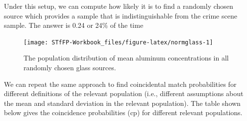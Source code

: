 \documentclass[]{book}
\theoremstyle{definition}
\theoremstyle{definition}
\theoremstyle{remark}
\begin{document}
Under this setup, we can compute how likely it is to find a randomly
chosen source which provides a sample that is indistinguishable from the
crime scene sample. The answer is 0.24 or 24\% of the time

\begin{figure}[h]

{\centering \texttt{[image: STfFP-Workbook\_files/figure-latex/normglass-1]} 

}

\caption{The population distribution of mean aluminum concentrations in all randomly chosen glass sources.}\label{fig:normglass}
\end{figure}

We can repeat the same approach to find coincidental match probabilities
for different definitions of the relevant population (i.e., different
assumptions about the mean and standard deviation in the relevant
population). The table shown below gives the coincidence probabilities
(cp) for different relevant populations.
\end{document}
